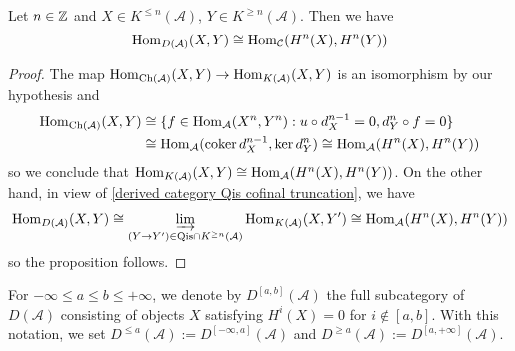 \begin{proposition}\label{derived category truncation Hom of leqgeq prop}
Let $n\in\mathbb{Z}$ and $X\in K^{\leq n}(\mathcal{A})$, $Y\in K^{\geq n}(\mathcal{A})$. Then we have
\begin{equation}
\mathrm{Hom}_{D(\mathcal{A})}(X,Y)\cong \mathrm{Hom}_{\mathcal{C}}(H^n(X),H^n(Y))
\end{equation}
\end{proposition}
\begin{proof}
The map $\mathrm{Hom}_{\mathrm{Ch}(\mathcal{A})}(X,Y)\to\mathrm{Hom}_{K(\mathcal{A})}(X,Y)$ is an isomorphism by our hypothesis and
\begin{align*}
\mathrm{Hom}_{\mathrm{Ch}(\mathcal{A})}(X,Y)&\cong\{f\in\mathrm{Hom}_{\mathcal{A}}(X^n,Y^n):u\circ d_X^{n-1}=0,d_Y^n\circ f=0\}\\
&\cong \mathrm{Hom}_\mathcal{A}(\operatorname{coker} d_X^{n-1},\operatorname{ker} d_Y^n)\cong\mathrm{Hom}_\mathcal{A}(H^n(X),H^n(Y))
\end{align*}
so we conclude that $\mathrm{Hom}_{K(\mathcal{A})}(X,Y)\cong\mathrm{Hom}_\mathcal{A}(H^n(X),H^n(Y))$. On the other hand, in view of \cref{derived category Qis cofinal truncation}, we have
\begin{align*}
\mathrm{Hom}_{D(\mathcal{A})}(X,Y)\cong\varinjlim_{(Y\to Y')\in\mathrm{Qis}\cap K^{\geq n}(\mathcal{A})}\mathrm{Hom}_{K(\mathcal{A})}(X,Y')\cong\mathrm{Hom}_{\mathcal{A}}(H^n(X),H^n(Y))
\end{align*}
so the proposition follows.
\end{proof}

For $-\infty\leq a\leq b\leq+\infty$, we denote by $D^{[a,b]}(\mathcal{A})$ the full subcategory of $D(\mathcal{A})$ consisting of objects $X$ satisfying $H^i(X)=0$ for $i\notin[a,b]$. With this notation, we set $D^{\leq a}(\mathcal{A}):=D^{[-\infty,a]}(\mathcal{A})$ and $D^{\geq a}(\mathcal{A}):=D^{[a,+\infty]}(\mathcal{A})$.

